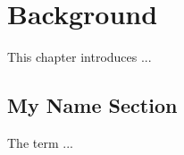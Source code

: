 \chapter{Background}
\label{ch:background}
This chapter introduces ...

\section{My Name Section}
\label{sec:background:mynamesection}
The term ...